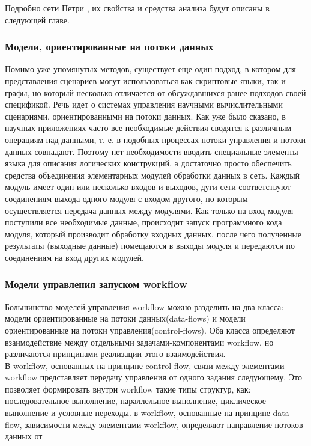 \documentclass[a4paper,14pt]{article}
\begin{document}
Подробно сети Петри , их свойства и средства анализа будут описаны в следующей главе.

\subsubsection{Модели, ориентированные на потоки данных}
Помимо уже упомянутых методов, существует еще один подход, в котором для представления сценариев могут использоваться как скриптовые
языки, так и графы, но который несколько отличается от обсуждавшихся
ранее подходов своей спецификой.
Речь идет о системах управления научными вычислительными сценариями, ориентированными на потоки данных. Как уже было сказано,
в научных приложениях часто все необходимые действия сводятся к различным операциям над данными, т. е. в подобных процессах потоки
управления и потоки данных совпадают. Поэтому нет необходимости вводить специальные элементы языка для описания логических конструкций, а достаточно просто обеспечить средства объединения элементарных модулей обработки данных в сеть. Каждый модуль имеет один или несколько входов и выходов, дуги сети соответствуют соединениям выхода одного
модуля с входом другого, по которым осуществляется передача данных
между модулями. Как только на вход модуля поступили все необходимые данные, происходит запуск программного кода модуля, который производит обработку входных данных, после чего полученные результаты (выходные данные) помещаются в выходы модуля и передаются по соединениям на вход других модулей.


\subsubsection{Модели управления запуском workflow}
  Большинство моделей управления workflow можно разделить на два класса: модели ориентированные на потоки данных(data-flows) и модели ориентированные на потоки управления(control-flows). Оба класса определяют взаимодействие между отдельными задачами-компонентами workflow, но различаются принципами реализации этого взаимодействия.  \\
  В workflow, основанных на принципе control-flow, связи между элементами workflow  представляет передачу управления от одного задания следующему. Это позволяет формировать внутри workflow такие типы структур, как: последовательное выполнение, параллельное выполнение, циклическое выполнение и условные переходы. в workflow, основанные на принципе data-flow, зависимости между элементами workflow, определяют направление потоков данных от 
  
\end{document}
